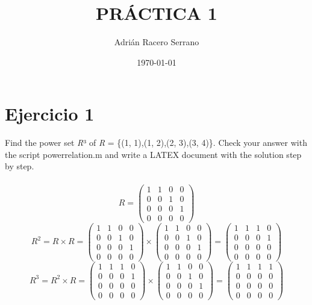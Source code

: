 \documentclass[11pt]{article}
\title{\textbf{PRÁCTICA 1}}
\author{Adrián Racero Serrano}
\date{\today}
\begin{document}
\maketitle
\thispagestyle{empty}

\section*{Ejercicio 1}
Find the power set \emph{R}³ of \emph{R} = \{(1, 1),(1, 2),(2, 3),(3, 4)\}. Check your answer
with the script powerrelation.m and write a LATEX document with the
solution step by step.
\\\\
\begin{equation}
	R=
	\begin{pmatrix}
		1 & 1 & 0 & 0\\
		0 & 0 & 1 & 0\\
		0 & 0 & 0 & 1\\
		0 & 0 & 0 & 0
	\end{pmatrix}
\end{equation}
\begin{equation}
	R^2 = R \times R =
	\begin{pmatrix}
		1 & 1 & 0 & 0\\
		0 & 0 & 1 & 0\\
		0 & 0 & 0 & 1\\
		0 & 0 & 0 & 0
	\end{pmatrix}
	\times
	\begin{pmatrix}
		1 & 1 & 0 & 0\\
		0 & 0 & 1 & 0\\
		0 & 0 & 0 & 1\\
		0 & 0 & 0 & 0
	\end{pmatrix}
	=
	\begin{pmatrix}
		1 & 1 & 1 & 0\\
		0 & 0 & 0 & 1\\
		0 & 0 & 0 & 0\\
		0 & 0 & 0 & 0
	\end{pmatrix}
\end{equation}
\begin{equation}
	R^3 = R^2 \times R =
	\begin{pmatrix}
		1 & 1 & 1 & 0\\
		0 & 0 & 0 & 1\\
		0 & 0 & 0 & 0\\
		0 & 0 & 0 & 0
	\end{pmatrix}
	\times
	\begin{pmatrix}
		1 & 1 & 0 & 0\\
		0 & 0 & 1 & 0\\
		0 & 0 & 0 & 1\\
		0 & 0 & 0 & 0
	\end{pmatrix}
	=
	\begin{pmatrix}
		1 & 1 & 1 & 1\\
		0 & 0 & 0 & 0\\
		0 & 0 & 0 & 0\\
		0 & 0 & 0 & 0
	\end{pmatrix}
\end{equation}
\end{document}
